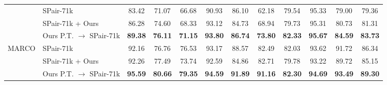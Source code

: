 \begin{table}[t]
{\begin{tabular}{llccccccccc|c}
& SPair-71k & 83.42 & 71.07 & 66.68 & 90.93 & 86.10 & 62.18 & 79.54 & 95.33 & 79.00 & 79.36 \\
& SPair-71k + Ours & 86.28 & 74.60 & 68.33 & 93.12 & 84.73 & 68.94 & 79.73 & 95.31 & 80.73 & 81.31 \\
& Ours P.T. $\rightarrow$ SPair-71k & \textbf{89.38} & \textbf{76.11} & \textbf{71.15} & \textbf{93.80} & \textbf{86.74} & \textbf{73.80} & \textbf{82.33} & \textbf{95.67} & \textbf{84.59} & \textbf{83.73} \\
\midrule
\multirow{3}{*}{MARCO \cite{cuttano2026marco}}
& SPair-71k 
& 92.16 & 76.76 & 76.53 & 93.17 & 88.57 & 82.49 & 82.03 & 93.62 & 91.72 & 86.34 \\
& SPair-71k + Ours 
& 92.26 & 77.49 & 73.74 & 92.59 & 84.86 & 82.71 & 79.78 & 93.22 & 89.72 & 85.15 \\
& Ours P.T. $\rightarrow$ SPair-71k 
& \textbf{95.59} & \textbf{80.66} & \textbf{79.35} & \textbf{94.59} & \textbf{91.89} & \textbf{91.16} & \textbf{82.30} & \textbf{94.69} & \textbf{93.49} & \textbf{89.30} \\
\bottomrule
\end{tabular}
}
\end{table}


